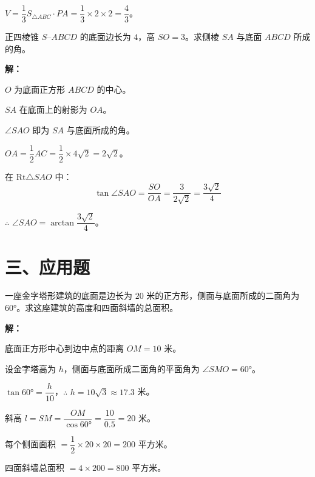 \documentclass[12pt, a4paper]{ctexart}
\begin{document}
$V = \dfrac{1}{3} S_{\triangle ABC} \cdot PA = \dfrac{1}{3} \times 2 \times 2 = \dfrac{4}{3}$。

\vspace{6pt}

\begin{examplebox}[【例题10】正四棱锥中求线面角]
正四棱锥 $S$--$ABCD$ 的底面边长为 $4$，高 $SO = 3$。求侧棱 $SA$ 与底面 $ABCD$ 所成的角。
\end{examplebox}

\textbf{解：}

$O$ 为底面正方形 $ABCD$ 的中心。

$SA$ 在底面上的射影为 $OA$。

$\angle SAO$ 即为 $SA$ 与底面所成的角。

$OA = \dfrac{1}{2}AC = \dfrac{1}{2} \times 4\sqrt{2} = 2\sqrt{2}$。

在 $\mathrm{Rt}\triangle SAO$ 中：
\[
\tan \angle SAO = \frac{SO}{OA} = \frac{3}{2\sqrt{2}} = \frac{3\sqrt{2}}{4}
\]

$\therefore$ $\angle SAO = \arctan \dfrac{3\sqrt{2}}{4}$。

\section*{\textcolor{apppurple}{三、应用题}}

\begin{appbox}[【应用1】金字塔形建筑]
一座金字塔形建筑的底面是边长为 $20$ 米的正方形，侧面与底面所成的二面角为 $60°$。求这座建筑的高度和四面斜墙的总面积。
\end{appbox}

\textbf{解：}

底面正方形中心到边中点的距离 $OM = 10$ 米。

设金字塔高为 $h$，侧面与底面所成二面角的平面角为 $\angle SMO = 60°$。

$\tan 60° = \dfrac{h}{10}$，$\therefore$ $h = 10\sqrt{3} \approx 17.3$ 米。

斜高 $l = SM = \dfrac{OM}{\cos 60°} = \dfrac{10}{0.5} = 20$ 米。

每个侧面面积 $= \dfrac{1}{2} \times 20 \times 20 = 200$ 平方米。

四面斜墙总面积 $= 4 \times 200 = 800$ 平方米。

\vspace{6pt}
\end{document}
